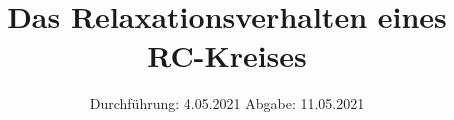 

\subject{Versuch Nr.V353}
\title{Das Relaxationsverhalten eines RC-Kreises}
\date{%
  Durchführung: 4.05.2021
  \hspace{3em}
  Abgabe: 11.05.2021
}



\maketitle
\thispagestyle{empty}
\tableofcontents
\newpage 








\nocite{*}

\printbibliography{}


